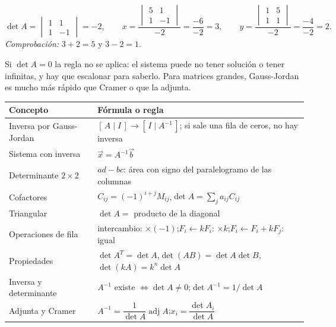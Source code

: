 \documentclass[11pt,a4paper]{article}
\DeclareMathOperator{\adj}{adj}
\let\zukarepaso\repaso
\renewcommand{\repaso}{\needspace{6\baselineskip}\zukarepaso}
\begin{document}
\begin{ejemplo}[Del video: $x+y=5$, $x-y=1$]
\[ \det A=\begin{vmatrix} 1 & 1\\ 1 & -1\end{vmatrix}=-2,\qquad
x=\frac{\begin{vmatrix} 5 & 1\\ 1 & -1\end{vmatrix}}{-2}=\frac{-6}{-2}=3,\qquad
y=\frac{\begin{vmatrix} 1 & 5\\ 1 & 1\end{vmatrix}}{-2}=\frac{-4}{-2}=2. \]
\emph{Comprobación:} $3+2=5$ y $3-2=1$. \checkmark
\end{ejemplo}

\begin{ojo}
Si $\det A=0$ la regla no se aplica: el sistema puede no tener solución o tener infinitas, y hay que escalonar para
saberlo. Para matrices grandes, Gauss-Jordan es mucho más rápido que Cramer o que la adjunta.
\end{ojo}

\repaso
\begin{center}
\begin{tabularx}{\linewidth}{@{}l L@{}}
\toprule
Concepto & Fórmula o regla\\ \midrule
Inversa por Gauss-Jordan & $[\,A\mid I\,]\to[\,I\mid A^{-1}\,]$; si sale una fila de ceros, no hay inversa\\
Sistema con inversa & $\vec x=A^{-1}\vec b$\\
Determinante $2\times2$ & $ad-bc$: área con signo del paralelogramo de las columnas\\
Cofactores & $C_{ij}=(-1)^{i+j}M_{ij}$,\quad $\det A=\sum_j a_{ij}C_{ij}$\\
Triangular & $\det A=$ producto de la diagonal\\
Operaciones de fila & intercambio: $\times(-1)$;\quad $F_i\leftarrow kF_i$: $\times k$;\quad $F_i\leftarrow F_i+kF_j$: igual\\
Propiedades & $\det A^T=\det A$,\quad $\det(AB)=\det A\det B$,\quad $\det(kA)=k^n\det A$\\
Inversa y determinante & $A^{-1}$ existe $\iff\det A\neq0$;\quad $\det A^{-1}=1/\det A$\\
Adjunta y Cramer & $A^{-1}=\dfrac{1}{\det A}\adj A$;\quad $x_i=\dfrac{\det A_i}{\det A}$\\
\bottomrule
\end{tabularx}
\end{center}
\end{document}
